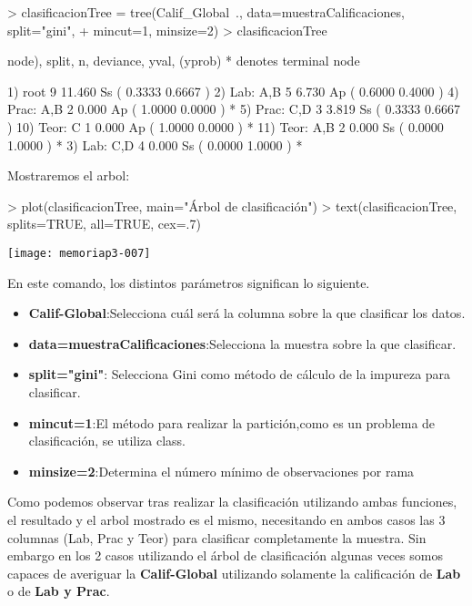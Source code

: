 \documentclass [a4paper] {article}
\begin{document}
\begin{Schunk}
\begin{Sinput}
> clasificacionTree = tree(Calif_Global~., data=muestraCalificaciones, split="gini",
+ mincut=1, minsize=2)
> clasificacionTree
\end{Sinput}
\begin{Soutput}
node), split, n, deviance, yval, (yprob)
      * denotes terminal node

 1) root 9 11.460 Ss ( 0.3333 0.6667 )  
   2) Lab: A,B 5  6.730 Ap ( 0.6000 0.4000 )  
     4) Prac: A,B 2  0.000 Ap ( 1.0000 0.0000 ) *
     5) Prac: C,D 3  3.819 Ss ( 0.3333 0.6667 )  
      10) Teor: C 1  0.000 Ap ( 1.0000 0.0000 ) *
      11) Teor: A,B 2  0.000 Ss ( 0.0000 1.0000 ) *
   3) Lab: C,D 4  0.000 Ss ( 0.0000 1.0000 ) *
\end{Soutput}
\end{Schunk}

Mostraremos el arbol: 

\begin{Schunk}
\begin{Sinput}
> plot(clasificacionTree, main="Árbol de clasificación")
> text(clasificacionTree, splits=TRUE, all=TRUE, cex=.7)
\end{Sinput}
\end{Schunk}
\texttt{[image: memoriap3-007]}

En este comando, los distintos parámetros significan lo siguiente.
\begin{itemize}
\item \textbf{Calif-Global}:Selecciona cuál será la columna sobre la que clasificar los datos.
\item \textbf{data=muestraCalificaciones}:Selecciona la muestra sobre la que clasificar.
\item \textbf{split="gini"}: Selecciona Gini como método de cálculo de la impureza para clasificar.
\item \textbf{mincut=1}:El método para realizar la partición,como es un problema de clasificación, se utiliza class.
\item \textbf{minsize=2}:Determina el número mínimo de observaciones por rama
\end{itemize}

Como podemos observar tras realizar la clasificación utilizando ambas funciones, el resultado y el arbol mostrado es el mismo, 
necesitando en ambos  casos las 3 columnas (Lab, Prac y Teor) para clasificar completamente la muestra. Sin embargo en los 2 casos utilizando el
árbol de clasificación algunas veces somos capaces de averiguar la \textbf{Calif-Global} utilizando solamente la calificación 
de \textbf{Lab} o de \textbf{Lab y Prac}.
\end{document}
